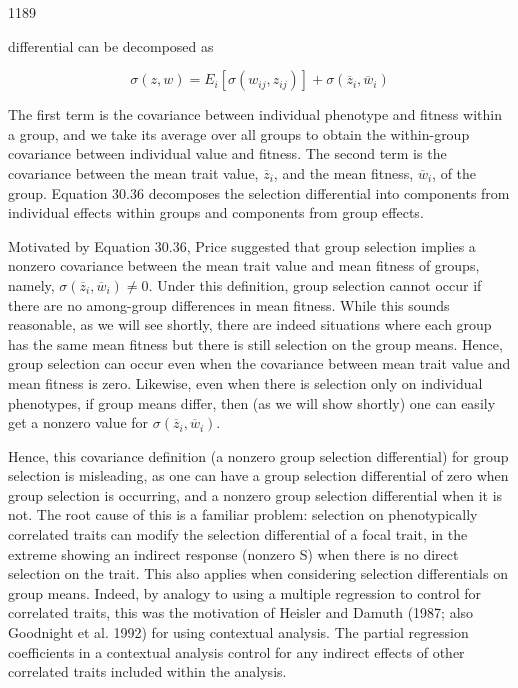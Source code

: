 \documentclass{article}
\begin{document}
1189

differential can be decomposed as

\begin{equation}
\sigma(z,w)=E_{i}\left[\sigma(w_{ij},z_{ij})\right]+\sigma(\overline{z}_{i},\overline{w}_{i})
\tag{30.36}
\label{eq:30_36}
\end{equation}

The first term is the covariance between individual phenotype and fitness within a group, and we take its average over all groups to obtain the within-group covariance between individual value and fitness. The second term is the covariance between the mean trait value,  $ \overline{z}_{i} $, and the mean fitness,  $ \overline{w}_{i} $, of the group. Equation 30.36 decomposes the selection differential into components from individual effects within groups and components from group effects.

Motivated by Equation 30.36, Price suggested that group selection implies a nonzero covariance between the mean trait value and mean fitness of groups, namely,  $ \sigma(\overline{z}_i, \overline{w}_i) \neq 0 $. Under this definition, group selection cannot occur if there are no among-group differences in mean fitness. While this sounds reasonable, as we will see shortly, there are indeed situations where each group has the same mean fitness but there is still selection on the group means. Hence, group selection can occur even when the covariance between mean trait value and mean fitness is zero. Likewise, even when there is selection only on individual phenotypes, if group means differ, then (as we will show shortly) one can easily get a nonzero value for  $ \sigma(\overline{z}_i, \overline{w}_i) $.

Hence, this covariance definition (a nonzero group selection differential) for group selection is misleading, as one can have a group selection differential of zero when group selection is occurring, and a nonzero group selection differential when it is not. The root cause of this is a familiar problem: selection on phenotypically correlated traits can modify the selection differential of a focal trait, in the extreme showing an indirect response (nonzero S) when there is no direct selection on the trait. This also applies when considering selection differentials on group means. Indeed, by analogy to using a multiple regression to control for correlated traits, this was the motivation of Heisler and Damuth (1987; also Goodnight et al. 1992) for using contextual analysis. The partial regression coefficients in a contextual analysis control for any indirect effects of other correlated traits included within the analysis.
\end{document}
